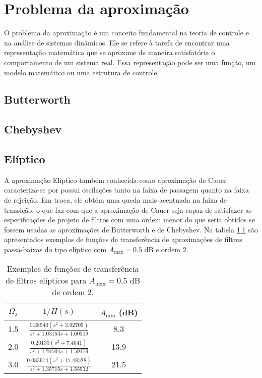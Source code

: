 
\chapter{Problema da aproximação}
\label{chap: aproximacao}

O problema da aproximação é um conceito fundamental na teoria de controle e na análise de sistemas dinâmicos. Ele se refere à tarefa de encontrar uma representação matemática que se aproxime de maneira satisfatória o comportamento de um sistema real. Essa representação pode ser uma função, um modelo matemático ou uma estrutura de controle.

\section{Butterworth}

\section{Chebyshev}

\section{Elíptico}

A aproximação Elíptico também conhecida como aproximação de Cauer caracteriza-se por possui oscilações tanto na faixa de passagem quanto na faixa de rejeição. Em troca, ele obtém uma queda mais acentuada na faixa de transição, o que faz com que a aproximação de Cauer seja capaz de satisfazer as especificações de projeto de filtros com uma ordem menor do que seria obtidos se fossem usadas as aproximações de Butterworth e de Chebyshev. Na tabela \ref{tab:eliptico} são apresentados exemplos de funções de transferência de aproximações de filtros passa-baixas do tipo elíptico com $A_\text{max} = 0.5$ dB e ordem 2. 

\begin{table}[!h]
    \centering
    \renewcommand{\arraystretch}{2.0}  %
    \caption{Exemplos de funções de transferência de filtros elípticos para $A_\text{max}  = 0.5$ dB de ordem 2.}
    \begin{tabular}{|c|c|c|}
        \hline
        $\Omega_s$ & $1/H(s)$ & $A_\text{min}$ (dB) \\
        \hline 
        1.5 & $ \frac{0.38540(s^2 + 3.92705)}{s^2 + 1.03153s + 1.60319}$ & 8.3\\
        \hline
        2.0 & $\frac{0.20133(s^2 + 7.4641)}{s^2 +  1.24504s +  1.59179}$& 13.9 \\
        \hline
        3.0 & $\frac{0.083974(s^2 + 17.48528)}{s^2 +  1.35715s +  1.55532}$& 21.5 \\ 
        \hline       
    \end{tabular} 
    \label{tab:eliptico}
\end{table}

